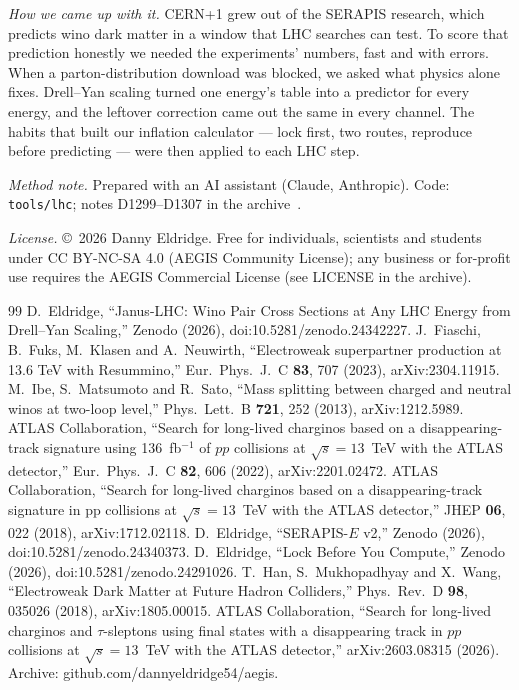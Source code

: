 \documentclass[aps,prd,twocolumn,superscriptaddress,nofootinbib,showkeys]{revtex4-2}
\begin{document}
\emph{How we came up with it.}
CERN+1 grew out of the SERAPIS research, which predicts wino dark matter in a window that LHC searches can test. To score that prediction honestly we needed the experiments' numbers, fast and with errors. When a parton-distribution download was blocked, we asked what physics alone fixes. Drell--Yan scaling turned one energy's table into a predictor for every energy, and the leftover correction came out the same in every channel. The habits that built our inflation calculator --- lock first, two routes, reproduce before predicting --- were then applied to each LHC step.

\emph{Method note.} Prepared with an AI assistant (Claude, Anthropic). Code: \texttt{tools/lhc}; notes D1299--D1307 in the archive~\cite{AEGIS}.

\emph{License.} \copyright~2026 Danny Eldridge. Free for individuals, scientists and students under CC BY-NC-SA 4.0 (AEGIS Community License); any business or for-profit use requires the AEGIS Commercial License (see LICENSE in the archive).

\begin{thebibliography}{99}
 D.~Eldridge, ``Janus-LHC: Wino Pair Cross Sections at Any LHC Energy from Drell--Yan Scaling,'' Zenodo (2026), doi:10.5281/zenodo.24342227.
 J.~Fiaschi, B.~Fuks, M.~Klasen and A.~Neuwirth, ``Electroweak superpartner production at 13.6 TeV with Resummino,'' Eur.\ Phys.\ J.\ C \textbf{83}, 707 (2023), arXiv:2304.11915.
 M.~Ibe, S.~Matsumoto and R.~Sato, ``Mass splitting between charged and neutral winos at two-loop level,'' Phys.\ Lett.\ B \textbf{721}, 252 (2013), arXiv:1212.5989.
 ATLAS Collaboration, ``Search for long-lived charginos based on a disappearing-track signature using 136~fb$^{-1}$ of $pp$ collisions at $\sqrt s=13$~TeV with the ATLAS detector,'' Eur.\ Phys.\ J.\ C \textbf{82}, 606 (2022), arXiv:2201.02472.
 ATLAS Collaboration, ``Search for long-lived charginos based on a disappearing-track signature in pp collisions at $\sqrt s=13$~TeV with the ATLAS detector,'' JHEP \textbf{06}, 022 (2018), arXiv:1712.02118.
 D.~Eldridge, ``SERAPIS-$E$ v2,'' Zenodo (2026), doi:10.5281/zenodo.24340373.
 D.~Eldridge, ``Lock Before You Compute,'' Zenodo (2026), doi:10.5281/zenodo.24291026.
 T.~Han, S.~Mukhopadhyay and X.~Wang, ``Electroweak Dark Matter at Future Hadron Colliders,'' Phys.\ Rev.\ D \textbf{98}, 035026 (2018), arXiv:1805.00015.
 ATLAS Collaboration, ``Search for long-lived charginos and $\tau$-sleptons using final states with a disappearing track in $pp$ collisions at $\sqrt s=13$~TeV with the ATLAS detector,'' arXiv:2603.08315 (2026).
 Archive: github.com/dannyeldridge54/aegis.
\end{thebibliography}
\end{document}

